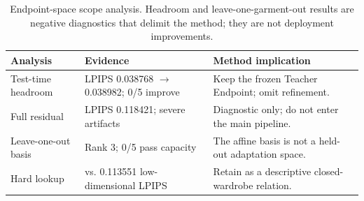 \begin{table}[t]
\centering
\small
\begin{tabular}{@{}>{\raggedright\arraybackslash}p{}>{\raggedright\arraybackslash}p{}>{\raggedright\arraybackslash}p{}@{}}
\toprule
Analysis & Evidence & Method implication \\
\midrule
Test-time headroom & LPIPS 0.038768 $\rightarrow$ 0.038982; 0/5 improve & Keep the frozen Teacher Endpoint; omit refinement. \\
Full residual & LPIPS 0.118421; severe artifacts & Diagnostic only; do not enter the main pipeline. \\
Leave-one-out basis & Rank 3; 0/5 pass capacity & The affine basis is not a held-out adaptation space. \\
Hard lookup & 0.113437 vs. 0.113551 low-dimensional LPIPS & Retain as a descriptive closed-wardrobe relation. \\
\bottomrule
\end{tabular}
\caption{Endpoint-space scope analysis. Headroom and leave-one-garment-out results are negative diagnostics that delimit the method; they are not deployment improvements.}
\label{tab:scope-adjudication}
\end{table}
